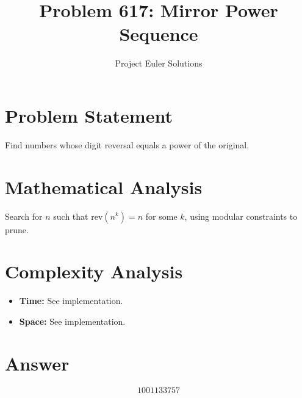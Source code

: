 \documentclass[11pt]{article}
\title{Problem 617: Mirror Power Sequence}
\author{Project Euler Solutions}
\date{}
\begin{document}
\maketitle

\section{Problem Statement}
Find numbers whose digit reversal equals a power of the original.

\section{Mathematical Analysis}
Search for $n$ such that $\text{rev}(n^k) = n$ for some $k$, using modular constraints to prune.

\section{Complexity Analysis}
\begin{itemize}
    \item \textbf{Time:} See implementation.
    \item \textbf{Space:} See implementation.
\end{itemize}

\section{Answer}

\[
\boxed{1001133757}
\]
\end{document}

